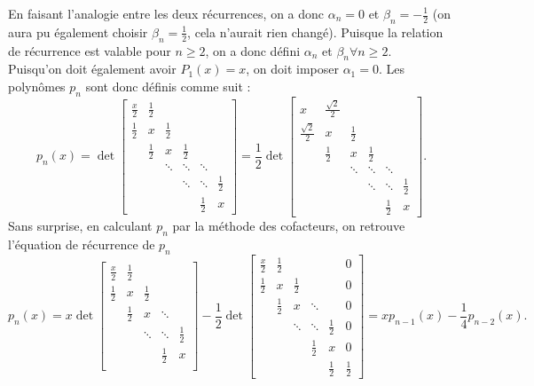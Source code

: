 En faisant l'analogie entre les deux récurrences,
on a donc $\alpha_n = 0$ et $\beta_n = -\frac{1}{2}$
(on aura pu également choisir $\beta_n = \frac{1}{2}$,
cela n'aurait rien changé).
Puisque la relation de récurrence est valable pour $n \geq 2$, on a donc défini $\alpha_n$ et $\beta_n \forall n \geq 2$.\\ Puisqu'on doit également avoir $P_1(x) = x$, on doit imposer $\alpha_1 = 0$. Les polynômes $p_n$ sont donc définis comme suit :
$$
p_n(x) = \det
\left[
  \begin{array}{cccccc}
    \frac{x}{2} & \frac{1}{2} & & & &  \\
    \frac{1}{2} & x & \frac{1}{2} & & & \\
      & \frac{1}{2} & x & \frac{1}{2} & & \\
      & & \ddots & \ddots & \ddots & \\
      & & & \ddots & \ddots &  \frac{1}{2}\\
      & & & &  \frac{1}{2} & x
  \end{array}
\right] = \frac{1}{2} \det \left[
  \begin{array}{cccccc}
    x & \frac{\sqrt{2}}{2} & & & &  \\
    \frac{\sqrt{2}}{2} & x & \frac{1}{2} & & & \\
      & \frac{1}{2} & x & \frac{1}{2} & & \\
      & & \ddots & \ddots & \ddots & \\
      & & & \ddots & \ddots &  \frac{1}{2}\\
      & & & &  \frac{1}{2} & x
  \end{array}
\right].
$$
Sans surprise, en calculant $p_n$ par la méthode des cofacteurs, on retrouve l'équation de récurrence de $p_n$
$$
p_n(x) = x \det
\left[
\begin{array}{ccccc}
\frac{x}{2} & \frac 12 & & &  \\
  \frac 12 & x & \frac 12 & & \\
 & \frac 12 & x & \ddots & \\
 & & \ddots & \ddots & \frac 12  \\
 & & & \frac 12 & x   \\
\end{array}
\right] - \frac 12\det
\left[
\begin{array}{cccccc}
\frac{x}{2} & \frac 12 & & & & 0 \\
\frac 12 & x & \frac 12 & & & 0\\
 & \frac 12 & x & \ddots & & 0\\
 & & \ddots & \ddots & \frac 12 & 0\\
 & & & \frac 12 & x &  0\\
 & & & &  \frac 12 &  \frac 12
\end{array}
\right] = xp_{n-1}(x)-\frac{1}{4}p_{n-2}(x).
$$

